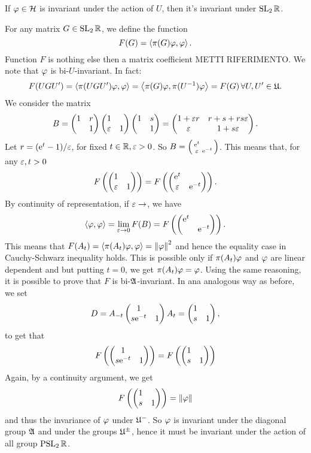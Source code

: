 \begin{nlem}
\label{lem:2.8_mautner_phenomemon_appendix}
If $\varphi\in\mathcal{H}$ is invariant under the action of $U$, then it's invariant under $\operatorname{SL}_{2}\mathbb{R}$.
\end{nlem}
\begin{prf}
For any matrix $G\in\operatorname{SL}_{2}\mathbb{R}$, we define the function 
\[
F(G)=\left< \pi(G)\varphi,\varphi\right>.
\]
Function $F$ is nothing else then a matrix coefficient METTI RIFERIMENTO. We note that $\varphi$ is bi-$U$-invariant. In fact:
\[
F(UGU')=\left< \pi(UGU')\varphi,\varphi\right>=\left< \pi(G)\varphi,\pi(U^{-1})\varphi\right>=F(G)\,\forall U,U'\in\mathfrak{U}.
\]
We consider the matrix
\[
B=\begin{pmatrix} 1&r\\&1 \end{pmatrix}\begin{pmatrix} 1&\\\varepsilon&1 \end{pmatrix}\begin{pmatrix} 1&s\\&1 \end{pmatrix}=\begin{pmatrix} 
1+\varepsilon r& r+s+rs\varepsilon\\
\varepsilon & 1+s\varepsilon
 \end{pmatrix}.
\]
Let $r=(\mathrm{e}^{t}-1)/\varepsilon$, for fixed $t\in\mathbb{R},\varepsilon>0$. So $B=\left(\begin{smallmatrix} \mathrm{e}^{t}&\\\varepsilon&\mathrm{e}^{-t} \end{smallmatrix}\right)$. This means that, for any $\varepsilon,t>0$
\[
F\left(
\begin{pmatrix} 1&\\\varepsilon&1 \end{pmatrix}\right)=F\left(
\begin{pmatrix} \mathrm{e}^{t}&\\\varepsilon&\mathrm{e}^{-t} \end{pmatrix}
\right).
\]
By continuity of representation, if $\varepsilon\to$, we have 
\[
\left< \varphi,\varphi\right>=\lim_{\varepsilon\to0}F(B)=F\left(
\begin{pmatrix} \mathrm{e}^{t}&\\&\mathrm{e}^{-t} \end{pmatrix}
\right).
\]
This means that $F(A_{t})=\left< \pi(A_{t})\varphi,\varphi\right>=\left\lVert \varphi\right\rVert^{2}$ and hence the equality case in Cauchy-Schwarz inequality holds. This is possible only if $\pi(A_{t})\varphi$ and $\varphi$ are linear dependent and but putting $t=0$, we get $\pi(A_{t})\varphi=\varphi$.  Using the same reasoning, it is possible to prove that $F$ is bi-$\mathfrak{A}$-invariant. In ana analogous way as before, we set 
\[
D=A_{-t}\begin{pmatrix} 1&\\s\mathrm{e}^{-t}&1 \end{pmatrix}A_{t}=\begin{pmatrix} 1&\\s&1 \end{pmatrix},
\]
to get that 
\[
F\left(
\begin{pmatrix} 
1&\\
s\mathrm{e}^{-t}&1
 \end{pmatrix}
\right)=F\left(
\begin{pmatrix} 
1&\\
s&1
 \end{pmatrix}
\right)
\]
Again, by a continuity argument, we get 
\[
F\left(
\begin{pmatrix} 1&\\s&1 \end{pmatrix}
\right)=\left\lVert \varphi\right\rVert
\]
and thus the invariance of $\varphi$ under $\mathfrak{U}^{-}$. So $\varphi$ is invariant under the diagonal group $\mathfrak{A}$ and under the groups $\mathfrak{U}^{\pm}$, hence it must be invariant under the action of all group $\operatorname{PSL}_{2}\mathbb{R}$.
\end{prf}

